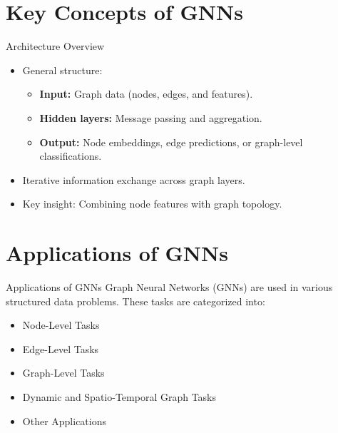 \documentclass{beamer}
\begin{document}
\section{Key Concepts of GNNs}
\begin{frame}{Architecture Overview}
    \begin{itemize}
        \item General structure:
        \begin{itemize}
            \item \textbf{Input:} Graph data (nodes, edges, and features).
            \item \textbf{Hidden layers:} Message passing and aggregation.
            \item \textbf{Output:} Node embeddings, edge predictions, or graph-level classifications.
        \end{itemize}
        \item Iterative information exchange across graph layers.
        \item Key insight: Combining node features with graph topology.
    \end{itemize}
\end{frame}


\section{Applications of GNNs}
\begin{frame}{Applications of GNNs}
    Graph Neural Networks (GNNs) are used in various structured data problems. These tasks are categorized into:
    \begin{itemize}
        \item Node-Level Tasks
        \item Edge-Level Tasks
        \item Graph-Level Tasks
        \item Dynamic and Spatio-Temporal Graph Tasks
        \item Other Applications
    \end{itemize}
\end{frame}
\end{document}
